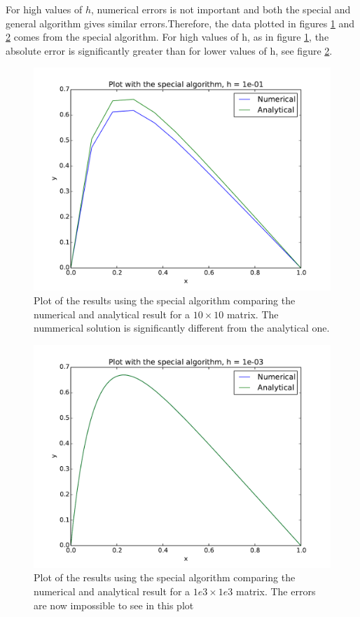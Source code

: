 For high values of $ h $, numerical errors is not important and both the special and general algorithm gives similar errors.Therefore, the data plotted in figures \ref{fig:num1e1} and \ref{fig:num1e3} comes from the special algorithm. For high values of h, as in figure \ref{fig:num1e1}, the absolute error is significantly greater than for lower values of h, see figure \ref{fig:num1e3}.  

\begin{figure}[H]
	\includegraphics[width = 1 \linewidth]{../programs/Plotting_kjetil/n_10.pdf}
	\caption{Plot of the results using the special algorithm comparing the numerical and analytical result for a $ 10\times 10 $ matrix. The  nummerical solution is significantly different from the analytical one.}
	\label{fig:num1e1}
\end{figure}


\begin{figure}[H]
	\includegraphics[width = 1 \linewidth]{../programs/Plotting_kjetil/n_1000.pdf}
	\caption{Plot of the results using the special algorithm comparing the numerical and analytical result for a $ 1e3\times 1e3 $ matrix. The errors are now impossible to see in this plot}
	\label{fig:num1e3}
\end{figure}





